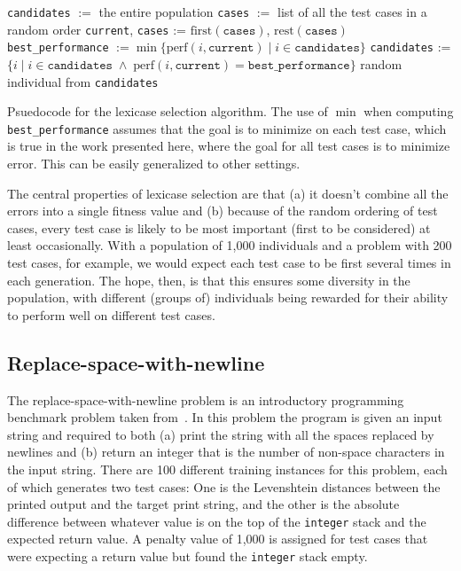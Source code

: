 \begin{algorithm}[tb]
	\begin{algorithmic}
		\STATE \texttt{candidates} $:=$ the entire population
		\STATE \texttt{cases} $:=$ list of all the test cases in a random order
		\STATE \texttt{current}, \texttt{cases} := $\textrm{first}(\texttt{cases})$, $\textrm{rest}(\texttt{cases})$
		\STATE \texttt{best\_performance} $:= \min \{ \textrm{perf}(i, \texttt{current}) \;|\; i \in \texttt{candidates} \}$
		\STATE \texttt{candidates} := $\{ i \;|\; i \in \texttt{candidates} \;\land\; \textrm{perf}(i, \texttt{current}) = \texttt{best\_performance}\}$
		\ENDWHILE
		\RETURN random individual from \texttt{candidates}
	\end{algorithmic}
	\caption{Psuedocode for the lexicase selection algorithm. The use of $\min$ when computing 
		\texttt{best\_performance} assumes that the goal is to minimize on each test case, which
		is true in the work presented here, where the goal for all test cases is to minimize error.
		This can be easily generalized to other settings.}
	\label{alg:lexicase}
\end{algorithm}

The central properties of lexicase selection are that (a) it doesn't combine all the errors into a single
fitness value and (b) because of the random ordering of test cases, every test case is likely to be
most important (first to be considered) at least occasionally. With a population of 1,000 individuals
and a problem with 200 test cases, for example, we would expect each test case to be first several
times in each generation. The hope, then, is that this ensures some diversity in the population, with
different (groups of) individuals being rewarded for their ability to perform well on different test
cases.

\subsection{Replace-space-with-newline}

The replace-space-with-newline problem is an introductory programming benchmark problem taken
from~\citep{Helmuth:2015:GECCO}. In this problem the program is given an input string and required to
both (a) print the string with all the spaces replaced by newlines and (b) return an integer that
is the number of non-space characters in the input string. There are 100 different training instances 
for this problem, each of which generates two test cases: One is the Levenshtein distances between
the printed output and the target print string, and the other is the absolute difference between
whatever value is on the top of the \texttt{integer} stack and the expected return value. A penalty
value of 1,000 is assigned for test cases that were expecting a return value but found the
\texttt{integer} stack empty.

